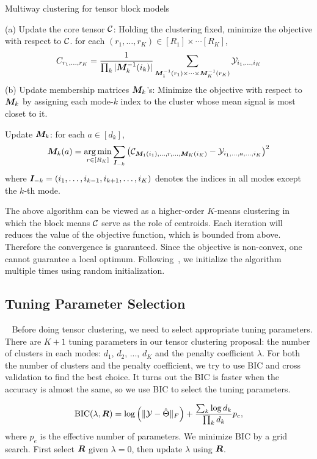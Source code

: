 \documentclass{article}
\begin{document}
	\begin{algorithm}\caption{Multiway clustering for tensor block models}
		\label{alg:B}
		\begin{algorithmic}

			\REPEAT 
			\STATE  (a) Update the core tensor $\mathcal{C}$:
			\STATE Holding the clustering fixed, minimize the objective with respect to $\mathcal{C}$. for each $(r_1,\ldots,r_K)\in[R_1]\times \cdots [R_K]$,
			\[
			C_{r_1,\ldots,r_K}={1\over \prod_k|\bm M_k^{-1}(i_k)|}\sum_{\bm M_1^{-1}(r_1)\times\cdots\times \bm M_K^{-1}(r_K)}\mathcal{Y}_{i_1,\ldots,i_K}
			\]
			\STATE (b) Update membership matrices $\bm M_k$'s:
			Minimize the objective with respect to $\bm M_k$ by assigning each mode-$k$ index to the cluster whose mean signal is most closet to it. 
			
			\STATE Update $\bm M_k$: for each $a\in[d_k]$,
			\[
			\bm M_k(a)=\operatorname*{arg\,min}_{r\in[R_K]}\sum_{\bm I_{-k}}\left(\mathcal{C}_{\bm M_1(i_1),\ldots,r,\ldots,\bm M_K(i_K)}-\mathcal{Y}_{i_1,\ldots,a,\ldots,i_K}\right)^2
			\]
			where $\bm I_{-k}=(i_1,\ldots,i_{k-1},i_{k+1},\ldots,i_K)$ denotes the indices in all modes except the $k$-th mode. 
		\ENDFOR
		
		\end{algorithmic}
	\end{algorithm}
The above algorithm can be viewed as a higher-order $K$-means clustering in which the block means $\mathcal{C}$ serve as the role of centroids. Each iteration will reduces the value of the objective function, which is bounded from above. Therefore the convergence is guaranteed. Since the objective is non-convex, one cannot guarantee a local optimum. Following~, we initialize the algorithm multiple times using random initialization. 

	
\subsection{Tuning Parameter Selection}~\label{sec:tuning}
Before doing tensor clustering, we need to select appropriate tuning parameters. 
There are $K+1$ tuning parameters in our tensor clustering proposal: the number of clusters in each modes: $d_1$, $d_2$, ..., $d_K$ and the penalty coefficient $\lambda$. For both the number of clusters and the penalty coefficient, we try to use BIC and cross validation to find the best choice. It turns out the BIC is faster when the accuracy is almost the same, so we use BIC to select the tuning parameters. \par
\begin{equation*}
\text{BIC}(\lambda,\bm{R}) =  \log\left(\lVert\mathcal{Y}-\hat \Theta\rVert_F\right)+{ \sum_k \log d_k \over \prod_k d_k}p_e,
\end{equation*}
where $p_e$ is the effective number of parameters. We minimize BIC by a grid search. First select $\bm{R}$ given $\lambda=0$, then update $\lambda$ using $\bm{R}$. 
\end{document}
